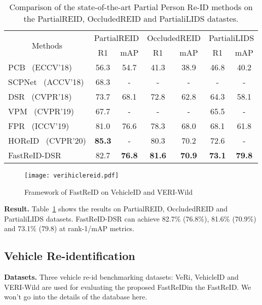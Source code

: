 \documentclass[10pt,twocolumn,letterpaper]{article}
\begin{document}
\begin{table}[t]
\caption{Comparison of the state-of-the-art Partial Person Re-ID methods on the PartialREID, OccludedREID and PartialiLIDS datastes.}
\label{tab5}
\centering
  \fontsize{6.7}{7.5}\selectfont
  \label{tab5}
\begin{tabular}{|l|cc|cc|cc|} \hline
    \multicolumn{1}{|c|}{\multirow{2}{*}{Methods}} & \multicolumn{2}{c|}{PartialREID} & \multicolumn{2}{c|}{OccludedREID} & \multicolumn{2}{c|}{PartialiLIDS} \\ \cline{2-7}
    \multicolumn{1}{|c|}{} & R1 & mAP & R1 & mAP& R1 & mAP \\ \hline 

PCB~\cite{sun2018beyond} (ECCV'18)              & 56.3& 54.7 &41.3  & 38.9& 46.8& 40.2     \\
SCPNet~\cite{fan2018scpnet} (ACCV'18)  & 68.3& - &-  & -  & -& -     \\
DSR~\cite{he2018deep} (CVPR'18)         & 73.7 & 68.1 & 72.8  & 62.8 & 64.3& 58.1     \\
VPM~\cite{sun2019perceive} (CVPR'19)       & 67.7 & -&    - & -     & 65.5 & -     \\ 
FPR~\cite{he2019foreground}     (ICCV'19)             & 81.0 & 76.6&     78.3  & 68.0& 68.1& 61.8         \\
HOReID~\cite{wang2020high}    (CVPR'20)    & \bf 85.3 &-&     80.3 & 70.2    & 72.6 &-\\ \hline
FastReID-DSR                 & 82.7 &\textbf{76.8}& \textbf{81.6} & \textbf{70.9} &\textbf{73.1}&\textbf{79.8}     \\  \hline
\end{tabular}
\end{table}
\begin{figure}[t]
    \centering
    \texttt{[image: verihiclereid.pdf]}
    \caption{{Framework of FastReID on VehicleID and VERI-Wild}}
    \label{fig11}
\end{figure}

\noindent\textbf{Result.} Table~\ref{tab5} shows the results on PartialREID, OccludedREID and PartialiLIDS datasets. FastReID-DSR can achieve 82.7\% (76.8\%), 81.6\% (70.9\%) and 73.1\% (79.8) at rank-1/mAP metrics.

\subsection{Vehicle Re-identification}
\noindent\textbf{Datasets.} Three vehicle re-id benchmarking datasets: VeRi, VehicleID and VERI-Wild are used for evaluating the proposed FastReIDin the FastReID. We won't go into the details of the database here.
\end{document}
